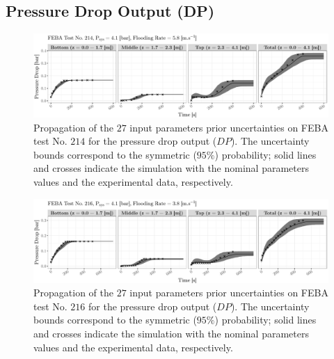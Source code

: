 \subsection{Pressure Drop Output (DP)}\label{app:tbl_results_uq_feba_dp}

\begin{figure}[bth]
    \centering
    \includegraphics[width=1.0\textwidth]{../figures/chapter2/figures/plotTraceUQPriorDP214}
    \caption[Propagation of the $27$ input parameters prior uncertainties on FEBA test No. $214$ for the pressure drop output ($DP$).]{Propagation of the $27$ input parameters prior uncertainties on FEBA test No. $214$ for the pressure drop output ($DP$). The uncertainty bounds correspond to the symmetric ($95\%$) probability; solid lines and crosses indicate the simulation with the nominal parameters values and the experimental data, respectively.}
    \label{fig:ch2_plot_trace_uq_prior_dp_214}
\end{figure}

\begin{figure}[bth]
    \centering
    \includegraphics[width=1.0\textwidth]{../figures/chapter2/figures/plotTraceUQPriorDP216}
    \caption[Propagation of the $27$ input parameters prior uncertainties on FEBA test No. $216$ for the pressure drop output ($DP$).]{Propagation of the $27$ input parameters prior uncertainties on FEBA test No. $216$ for the pressure drop output ($DP$). The uncertainty bounds correspond to the symmetric ($95\%$) probability; solid lines and crosses indicate the simulation with the nominal parameters values and the experimental data, respectively.}
    \label{fig:ch2_app_plot_trace_uq_prior_dp_216}
\end{figure}

